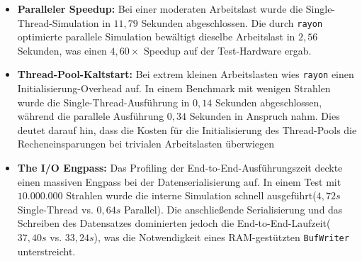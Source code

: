 \documentclass{article}
\begin{document}
    \begin{itemize}
        \item \textbf{Paralleler Speedup:} Bei einer moderaten Arbeitslast wurde die Single-Thread-Simulation in $11,79$ Sekunden abgeschlossen.
        Die durch \texttt{rayon} optimierte parallele Simulation bewältigt dieselbe Arbeitslast in $2,56$ Sekunden, was einen $4{,}60\times$ Speedup auf der Test-Hardware ergab.
        \item \textbf{Thread-Pool-Kaltstart:} Bei extrem kleinen Arbeitslasten wies \texttt{rayon} einen Initialisierung-Overhead auf.
        In einem Benchmark mit wenigen Strahlen wurde die Single-Thread-Ausführung in $0,14$ Sekunden abgeschlossen, während die parallele Ausführung $0,34$ Sekunden in Anspruch nahm.
        Dies deutet darauf hin, dass die Kosten für die Initialisierung des Thread-Pools die Recheneinsparungen bei trivialen Arbeitslasten überwiegen
        \item \textbf{The I/O Engpass:} Das Profiling der End-to-End-Ausführungszeit deckte einen massiven Engpass bei der Datenserialisierung auf.
        In einem Test mit $10.000.000$ Strahlen wurde die interne Simulation schnell ausgeführt($4,72s$ Single-Thread vs. $0,64s$ Parallel).
        Die anschließende Serialisierung und das Schreiben des Datensatzes dominierten jedoch die End-to-End-Laufzeit($37,40s$ vs. $33,24s$),
        was die Notwendigkeit eines RAM-gestützten \texttt{BufWriter} unterstreicht.
    \end{itemize}
\end{document}
